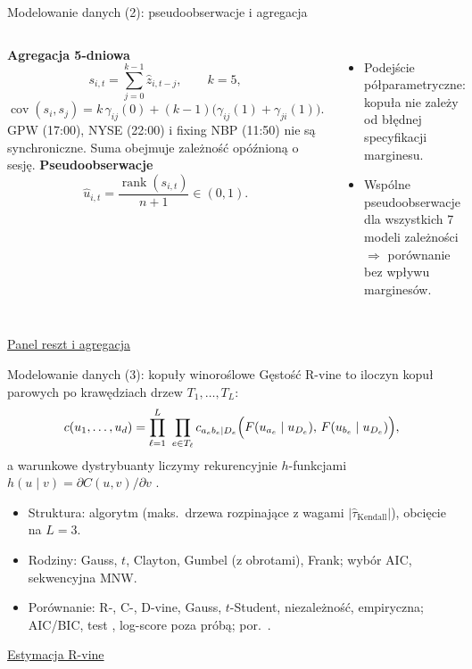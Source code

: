 \documentclass[aspectratio=169,11pt]{beamer}
\newcommand{\repo}{https://github.com/michalmarchwiak/bsc-project}
\newcommand{\rev}{9e941db56fde866672b262f5f6725268ce58feb7}
\newcommand{\src}[2]{\vfill{\scriptsize\color{Teal}%
  \href{\repo/blob/\rev/#1}{#2}}}
\begin{document}
\begin{frame}{Modelowanie danych (2): pseudoobserwacje i agregacja}
  \begin{columns}[T,onlytextwidth]
    \textbf{Agregacja 5-dniowa}
    \[
      s_{i,t}=\sum_{j=0}^{k-1}\hat z_{i,t-j},\qquad k=5,
    \]
    \[
      \operatorname{cov}(s_i,s_j)=k\,\gamma_{ij}(0)
        +(k-1)\bigl(\gamma_{ij}(1)+\gamma_{ji}(1)\bigr).
    \]
    GPW (17:00), NYSE (22:00) i fixing NBP (11:50) nie są
    synchroniczne. Suma obejmuje zależność opóźnioną o sesję.
    \textbf{Pseudoobserwacje}
    \[
      \hat u_{i,t}=\frac{\operatorname{rank}(s_{i,t})}{n+1}\in(0,1).
    \]
    \begin{itemize}
      \item Podejście półparametryczne: kopuła nie zależy od
        błędnej specyfikacji marginesu.
      \item Wspólne pseudoobserwacje dla wszystkich 7 modeli
        zależności \(\Rightarrow\) porównanie bez wpływu marginesów.
    \end{itemize}
  \end{columns}
  \src{docs/dependence_model.md}{Panel reszt i agregacja}
\end{frame}

\begin{frame}{Modelowanie danych (3): kopuły winoroślowe}
  Gęstość R-vine to iloczyn kopuł parowych po krawędziach drzew
  \(T_1,\dots,T_L\):
  \[
    c(u_1,\dots,u_d)=\prod_{\ell=1}^{L}\ \prod_{e\in T_\ell}
      c_{a_e b_e\mid D_e}\Bigl(F(u_{a_e}\mid u_{D_e}),\,
                              F(u_{b_e}\mid u_{D_e})\Bigr),
  \]
  a warunkowe dystrybuanty liczymy rekurencyjnie \(h\)-funkcjami
  \(h(u\mid v)=\partial C(u,v)/\partial v\)
  \citep{bedford2002,aas2009}.
  \begin{itemize}
    \item Struktura: algorytm \citet{dissmann2013} (maks.\ drzewa rozpinające
      z wagami \(|\hat\tau_{\text{Kendall}}|\)), obcięcie na \(L=3\).
    \item Rodziny: Gauss, \(t\), Clayton, Gumbel (z obrotami), Frank;
      wybór AIC, sekwencyjna MNW.
    \item Porównanie: R-, C-, D-vine, Gauss, \(t\)-Student,
      niezależność, empiryczna; AIC/BIC, test \citet{vuong1989},
      log-score poza próbą; por.\ \citet{muller2024}.
  \end{itemize}
  \src{src/pf/models/rvine.py}{Estymacja R-vine}
\end{frame}
\end{document}
